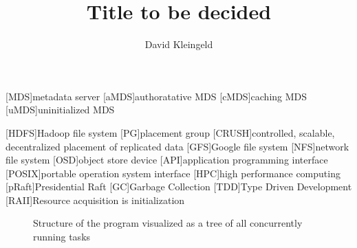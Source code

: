 \documentclass[lang=en, hanging-titles=true]{skrapport}
\title{Title to be decided}
\author{David Kleingeld}
\begin{document}
\begin{titlepage}
\maketitle
\end{titlepage}
\tableofcontents
\clearpage

\newcommand{\zookeeper}{ZooKeeper}
\newcommand{\raft}{Raft}
\newcommand{\paxos}{Paxos}
\newcommand{\multipaxos}{Multi-Paxos}
\newcommand{\ceph}{Ceph}
\newcommand{\zab}{Zab}

\newcommand{\name}{my system}
\newcommand{\Name}{My system}

\newcommand{\textacro}[1]{\small{#1}}
\begin{acronym}
	[\textacro{MDS}]{metadata server}
	[\textacro{aMDS}]{authoratative MDS}
	[\textacro{cMDS}]{caching MDS}
	[\textacro{uMDS}]{uninitialized MDS}

	[\textacro{HDFS}]{Hadoop file system}
	[\textacro{PG}]{placement group}
	[\textacro{CRUSH}]{controlled, scalable, decentralized placement of replicated data}
	[\textacro{GFS}]{Google file system}
	[\textacro{NFS}]{network file system}
	[\textacro{OSD}]{object store device}
	[\textacro{API}]{application programming interface}
	[\textacro{POSIX}]{portable operation system interface}
	[\textacro{HPC}]{high performance computing}
	[\textacro{pRaft}]{Presidential Raft}
	[\textacro{GC}]{Garbage Collection}
	[\textacro{TDD}]{Type Driven Development}
	[\textacro{RAII}]{Resource acquisition is initialization}
\end{acronym}



\begin{figure}[htbp]
	\centering
	
	\caption{Structure of the program visualized as a tree of all concurrently running tasks}
	\label{fig:tree}
\end{figure}
\end{document}
